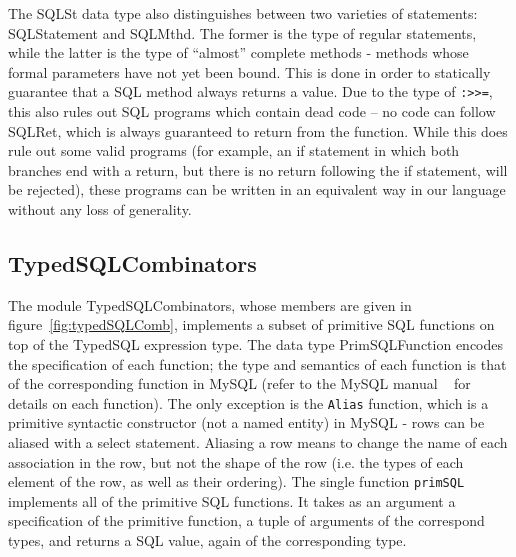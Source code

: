 The SQLSt data type also distinguishes between two varieties of statements:
SQLStatement and SQLMthd. The former is the type of regular statements, 
while the latter is the type of ``almost'' complete methods - methods whose 
formal parameters have not yet been bound. This is done in order to statically
guarantee that a SQL method always returns a value. Due to the type of
\lstinline{:>>=}, this also rules out SQL programs which contain dead code -- no
code can follow SQLRet, which is always guaranteed to return from the 
function.
While this does rule out some valid programs (for example, an if statement 
in
which both branches end with a return, but there is no return following the 
if
statement, will be rejected), these programs can be written in an equivalent
way in our language without any loss of generality.    

\subsection{TypedSQLCombinators}

The module TypedSQLCombinators, whose members are given in 
figure~\ref{fig:typedSQLComb},
implements a subset of primitive SQL functions on top of the TypedSQL 
expression type. 
The data type PrimSQLFunction encodes the specification of each 
function; the type
and semantics of each function is that of the corresponding function in 
MySQL (refer to
the MySQL manual ~\cite{mySQLman} for details on each function). The 
only exception
is the \lstinline{Alias} function, which is a primitive syntactic 
constructor (not a named entity)
in MySQL - rows can be aliased with a select statement. Aliasing a row 
means to change
the name of each association in the row, but not the shape of the row 
(i.e. the types of
each element of the row, as well as their ordering). The single 
function \lstinline{primSQL}
implements all of the primitive SQL functions. It takes as an argument 
a specification
of the primitive function, a tuple of arguments of the correspond 
types, and returns
a SQL value, again of the corresponding type. 


